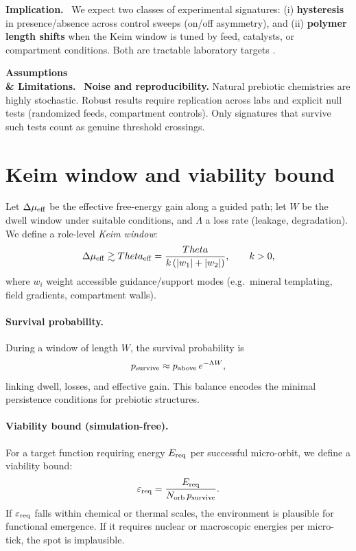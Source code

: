 \documentclass[12pt,a4paper,oneside]{scrreprt}
\def\Theta{Theta}%
\newenvironment{implication}{\par\vspace{0.5em}\noindent\textbf{Implication.}\ }{\par\vspace{0.5em}}
\newenvironment{limitation}{\par\vspace{0.5em}\noindent\textbf{Assumptions \\ \& Limitations.}\ }{\par\vspace{0.5em}}
\begin{document}
\begin{implication}
We expect two classes of experimental signatures: 
(i) \textbf{hysteresis} in presence/absence across control sweeps 
(on/off asymmetry), and 
(ii) \textbf{polymer length shifts} when the Keim window 
is tuned by feed, catalysts, or compartment conditions. 
Both are tractable laboratory targets 
\citep{Joyce2002DirectedEvolution,Adamala2017CompartmentChemistry}.
\end{implication}

\begin{limitation}
\textbf{Noise and reproducibility.} 
Natural prebiotic chemistries are highly stochastic. 
Robust results require replication across labs 
and explicit null tests (randomized feeds, compartment controls). 
Only signatures that survive such tests 
count as genuine threshold crossings. 
\end{limitation}

\section{Keim window and viability bound}\label{sec:life-keim}

Let $\Delta\mu_{\rm eff}$ be the effective free-energy gain along a guided path; 
let $W$ be the dwell window under suitable conditions, 
and $\Lambda$ a loss rate (leakage, degradation). 
We define a role-level \emph{Keim window}:
\begin{equation}
\Delta\mu_{\rm eff} \gtrsim \Theta_{\rm eff}
= \frac{\Theta}{k\,(|w_1|+|w_2|)},\qquad k>0,
\end{equation}
where $w_i$ weight accessible guidance/support modes 
(e.g.\ mineral templating, field gradients, compartment walls). 

\paragraph{Survival probability.}
During a window of length $W$, the survival probability is
\begin{equation}
p_{\rm survive} \approx p_{\rm above}\,e^{-\Lambda W},
\end{equation}
linking dwell, losses, and effective gain. 
This balance encodes the minimal persistence conditions 
for prebiotic structures.

\paragraph{Viability bound (simulation-free).}
For a target function requiring energy $E_{\rm req}$ 
per successful micro-orbit, 
we define a viability bound:
\begin{equation}
\varepsilon_{\rm req} = 
\frac{E_{\rm req}}{N_{\rm orb}\,p_{\rm survive}}.
\end{equation}
If $\varepsilon_{\rm req}$ falls within chemical or thermal scales, 
the environment is plausible for functional emergence. 
If it requires nuclear or macroscopic energies per micro-tick, 
the spot is implausible.
\end{document}
